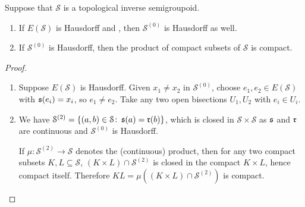 \begin{lemma}\label{lem:ES.Hausdorff.and.S0.Hausdorff}
    Suppose that $\mathcal{S}$ is a topological inverse semigroupoid.
    \begin{enumerate}[label=(\alph*)]
        \item\label{lem:ES.Hausdorff.and.S0.Hausdorff1} If $E(\mathcal{S})$ is Hausdorff and , then $\mathcal{S}^{(0)}$ is Hausdorff as well.
        \item\label{lem:ES.Hausdorff.and.S0.Hausdorff2} If $\mathcal{S}^{(0)}$ is Hausdorff, then the product of compact subsets of $\mathcal{S}$ is compact.
    \end{enumerate}
\end{lemma}
\begin{proof}
    \begin{enumerate}[label=(\alph*)]
    \item Suppose $E(\mathcal{S})$ is Hausdorff. Given $x_1\neq x_2$ in $\mathcal{S}^{(0)}$, choose $e_1,e_2\in E(\mathcal{S})$ with $\operatorname{\mathfrak{s}}(e_i)=x_i$, so $e_1\neq e_2$. Take any two open bisections $U_1,U_2$ with $e_i\in U_i$. 
    \item We have $\mathcal{S}^{(2)}=\left\{(a,b)\in\mathcal{S}\colon \operatorname{\mathfrak{s}}(a)=\operatorname{\mathfrak{r}}(b)\right\}$, which is closed in $\mathcal{S}\times\mathcal{S}$ as $\operatorname{\mathfrak{s}}$ and $\operatorname{\mathfrak{r}}$ are continuous and $\mathcal{S}^{(0)}$ is Hausdorff.
    
    If $\mu\colon\mathcal{S}^{(2)}\to\mathcal{S}$ denotes the (continuous) product, then for any two compact subsets $K,L\subseteq\mathcal{S}$, $(K\times L)\cap\mathcal{S}^{(2)}$ is closed in the compact $K\times L$, hence compact itself. Therefore $KL=\mu((K\times L)\cap\mathcal{S}^{(2)})$ is compact.\qedhere
    \end{enumerate}
\end{proof}


